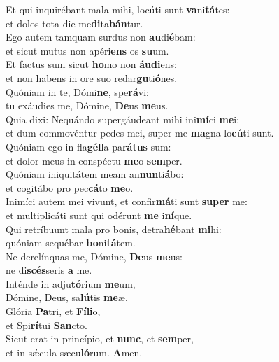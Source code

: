 \oddverse Et qui inquirébant mala mihi, locúti sunt \textbf{va}ni\textbf{tá}tes:~\*\\
\oddverse et dolos tota die me\textbf{di}ta\textbf{bán}tur.\\
\evenverse Ego autem tamquam surdus non \textbf{au}di\textbf{é}bam:~\*\\
\evenverse et sicut mutus non apéri\textbf{ens} os \textbf{su}um.\\
\oddverse Et factus sum sicut \textbf{ho}mo non \textbf{áu}\textbf{di}ens:~\*\\
\oddverse et non habens in ore suo redar\textbf{gu}ti\textbf{ó}nes.\\
\evenverse Quóniam in te, Dómi\textbf{ne}, spe\textbf{rá}vi:~\*\\
\evenverse tu exáudies me, Dómine, \textbf{De}us \textbf{me}us.\\
\oddverse Quia dixi: Nequándo supergáudeant mihi ini\textbf{mí}ci \textbf{me}i:~\*\\
\oddverse et dum commovéntur pedes mei, super me \textbf{ma}gna lo\textbf{cú}ti sunt.\\
\evenverse Quóniam ego in fla\textbf{gél}la pa\textbf{rá}\textbf{tus} sum:~\*\\
\evenverse et dolor meus in conspéctu \textbf{me}o \textbf{sem}per.\\
\oddverse Quóniam iniquitátem meam an\textbf{nun}ti\textbf{á}bo:~\*\\
\oddverse et cogitábo pro pec\textbf{cá}to \textbf{me}o.\\
\evenverse Inimíci autem mei vivunt, et confir\textbf{má}ti sunt \textbf{su}\textbf{per} me:~\*\\
\evenverse et multiplicáti sunt qui odérunt \textbf{me} i\textbf{ní}que.\\
\oddverse Qui retríbuunt mala pro bonis, detra\textbf{hé}bant \textbf{mi}hi:~\*\\
\oddverse quóniam sequébar \textbf{bo}ni\textbf{tá}tem.\\
\evenverse Ne derelínquas me, Dómine, \textbf{De}us \textbf{me}us:~\*\\
\evenverse ne di\textbf{scés}seris \textbf{a} me.\\
\oddverse Inténde in adju\textbf{tó}rium \textbf{me}um,~\*\\
\oddverse Dómine, Deus, sa\textbf{lú}tis \textbf{me}æ.\\
\evenverse Glória \textbf{Pa}tri, et \textbf{Fí}\textbf{li}o,~\*\\
\evenverse et Spi\textbf{rí}tui \textbf{San}cto.\\
\oddverse Sicut erat in princípio, et \textbf{nunc}, et \textbf{sem}per,~\*\\
\oddverse et in sǽcula sæcu\textbf{ló}rum. \textbf{A}men.\\
